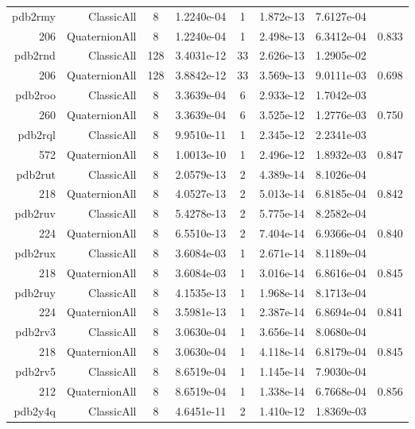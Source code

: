 \begin{xltabular}{\textwidth}{r|rcS[table-format=1.4e+2]cS[table-format=1.3e+2]S[table-format=1.4e+2]S[table-format=-1.3]}
pdb2rmy & ClassicAll & 8 & 1.2240e-04 & 1 & 1.872e-13 & 7.6127e-04 & \\
206 & QuaternionAll & 8 & 1.2240e-04 & 1 & 2.498e-13 & 6.3412e-04 & 0.833\\  \addlinespace
pdb2rnd & ClassicAll & 128 & 3.4031e-12 & 33 & 2.626e-13 & 1.2905e-02 & \\
206 & QuaternionAll & 128 & 3.8842e-12 & 33 & 3.569e-13 & 9.0111e-03 & 0.698\\  \addlinespace
pdb2roo & ClassicAll & 8 & 3.3639e-04 & 6 & 2.933e-12 & 1.7042e-03 & \\
260 & QuaternionAll & 8 & 3.3639e-04 & 6 & 3.525e-12 & 1.2776e-03 & 0.750\\  \addlinespace
pdb2rql & ClassicAll & 8 & 9.9510e-11 & 1 & 2.345e-12 & 2.2341e-03 & \\
572 & QuaternionAll & 8 & 1.0013e-10 & 1 & 2.496e-12 & 1.8932e-03 & 0.847\\  \addlinespace
pdb2rut & ClassicAll & 8 & 2.0579e-13 & 2 & 4.389e-14 & 8.1026e-04 & \\
218 & QuaternionAll & 8 & 4.0527e-13 & 2 & 5.013e-14 & 6.8185e-04 & 0.842\\  \addlinespace
pdb2ruv & ClassicAll & 8 & 5.4278e-13 & 2 & 5.775e-14 & 8.2582e-04 & \\
224 & QuaternionAll & 8 & 6.5510e-13 & 2 & 7.404e-14 & 6.9366e-04 & 0.840\\  \addlinespace
pdb2rux & ClassicAll & 8 & 3.6084e-03 & 1 & 2.671e-14 & 8.1189e-04 & \\
218 & QuaternionAll & 8 & 3.6084e-03 & 1 & 3.016e-14 & 6.8616e-04 & 0.845\\  \addlinespace
pdb2ruy & ClassicAll & 8 & 4.1535e-13 & 1 & 1.968e-14 & 8.1713e-04 & \\
224 & QuaternionAll & 8 & 3.5981e-13 & 1 & 2.387e-14 & 6.8694e-04 & 0.841\\  \addlinespace
pdb2rv3 & ClassicAll & 8 & 3.0630e-04 & 1 & 3.656e-14 & 8.0680e-04 & \\
218 & QuaternionAll & 8 & 3.0630e-04 & 1 & 4.118e-14 & 6.8179e-04 & 0.845\\  \addlinespace
pdb2rv5 & ClassicAll & 8 & 8.6519e-04 & 1 & 1.145e-14 & 7.9030e-04 & \\
212 & QuaternionAll & 8 & 8.6519e-04 & 1 & 1.338e-14 & 6.7668e-04 & 0.856\\  \addlinespace
pdb2y4q & ClassicAll & 8 & 4.6451e-11 & 2 & 1.410e-12 & 1.8369e-03 & \\

\end{xltabular}
